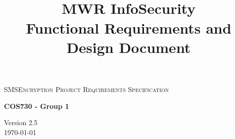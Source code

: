 \begin{titlepage}
\begin{center}

\textsc{\LARGE SMSEncryption Project Requirements Specification}

\textbf{COS730 - Group 1} \\

\title{
  \textbf{\\}
MWR InfoSecurity\\
Functional Requirements and Design Document\\
}

\vfill

{\large Version 2.5}
\\
{\large \today}

\end{center}
\end{titlepage}
